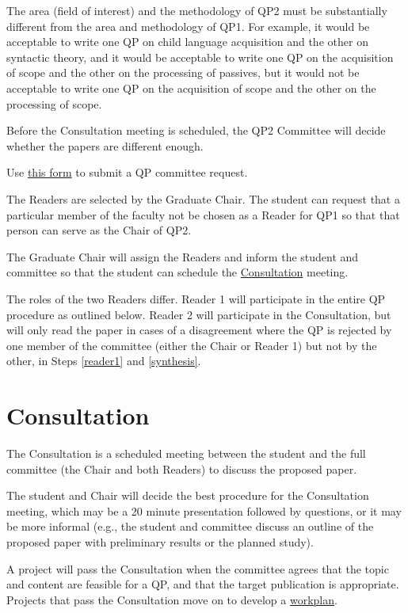 \documentclass[
]{book}
\begin{document}
The area (field of interest) and the methodology of QP2 must be substantially different from the area and methodology of QP1. For example, it would be acceptable to write one QP on child language acquisition and the other on syntactic theory, and it would be acceptable to write one QP on the acquisition of scope and the other on the processing of passives, but it would not be acceptable to write one QP on the acquisition of scope and the other on the processing of scope.

Before the Consultation meeting is scheduled, the QP2 Committee will decide whether the papers are different enough.

Use \href{https://forms.gle/YNipJTdAiRSxnrHU8}{this form} to submit a QP committee request.

The Readers are selected by the Graduate Chair. The student can request that a particular member of the faculty not be chosen as a Reader for QP1 so that that person can serve as the Chair of QP2.

The Graduate Chair will assign the Readers and inform the student and committee so that the student can schedule the \hyperref[consultation]{Consultation} meeting.

The roles of the two Readers differ. Reader 1 will participate in the entire QP procedure as outlined below. Reader 2 will participate in the Consultation, but will only read the paper in cases of a disagreement where the QP is rejected by one member of the committee (either the Chair or Reader 1) but not by the other, in Steps \ref{reader1} and \ref{synthesis}.

\section{Consultation}\label{consultation}

The Consultation is a scheduled meeting between the student and the full committee (the Chair and both Readers) to discuss the proposed paper.

The student and Chair will decide the best procedure for the Consultation meeting, which may be a 20 minute presentation followed by questions, or it may be more informal (e.g., the student and committee discuss an outline of the proposed paper with preliminary results or the planned study).

A project will pass the Consultation when the committee agrees that the topic and content are feasible for a QP, and that the target publication is appropriate. Projects that pass the Consultation move on to develop a \hyperref[workplan]{workplan}.
\end{document}
